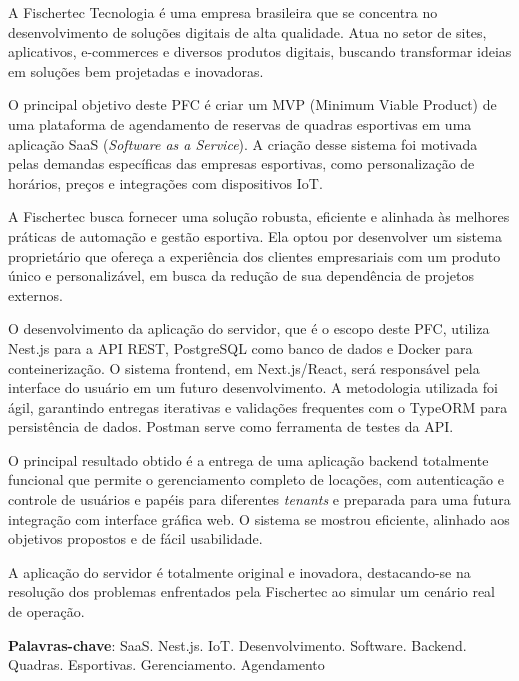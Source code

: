 \begin{resumo}
	\SingleSpacing
	A Fischertec Tecnologia é uma empresa brasileira que se concentra no desenvolvimento de soluções digitais de alta qualidade. Atua no setor de sites, aplicativos, e-commerces e diversos produtos digitais, buscando transformar ideias em soluções bem projetadas e inovadoras.

	O principal objetivo deste PFC é criar um MVP (Minimum Viable Product) de uma plataforma de agendamento de reservas de quadras esportivas em uma aplicação SaaS (\textit{Software as a Service}). A criação desse sistema foi motivada pelas demandas específicas das empresas esportivas, como personalização de horários, preços e integrações com dispositivos IoT.

	A Fischertec busca fornecer uma solução robusta, eficiente e alinhada às melhores práticas de automação e gestão esportiva. Ela optou por desenvolver um sistema proprietário que ofereça a experiência dos clientes empresariais com um produto único e personalizável, em busca da redução de sua dependência de projetos externos.

	O desenvolvimento da aplicação do servidor, que é o escopo deste PFC, utiliza Nest.js para a API REST, PostgreSQL como banco de dados e Docker para conteinerização. O sistema frontend, em Next.js/React, será responsável pela interface do usuário em um futuro desenvolvimento. A metodologia utilizada foi ágil, garantindo entregas iterativas e validações frequentes com o TypeORM para persistência de dados. Postman serve como ferramenta de testes da API.

	O principal resultado obtido é a entrega de uma aplicação backend totalmente funcional que permite o gerenciamento completo de locações, com autenticação e controle de usuários e papéis para diferentes \textit{tenants} e preparada para uma futura integração com interface gráfica web. O sistema se mostrou eficiente, alinhado aos objetivos propostos e de fácil usabilidade.

	A aplicação do servidor é totalmente original e inovadora, destacando-se na resolução dos problemas enfrentados pela Fischertec ao simular um cenário real de operação.

	\textbf{Palavras-chave}: SaaS. Nest.js. IoT. Desenvolvimento. Software. Backend. Quadras. Esportivas. Gerenciamento. Agendamento
\end{resumo}

		
